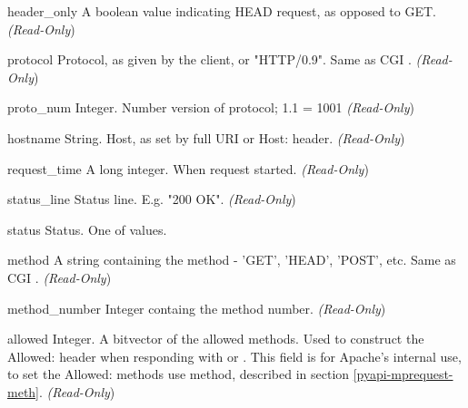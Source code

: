 \begin{memberdesc}[Request]{header_only}
A boolean value indicating HEAD request, as opposed to GET. 
\emph{(Read-Only})
\end{memberdesc}

\begin{memberdesc}[Request]{protocol}
Protocol, as given by the client, or "HTTP/0.9". Same as CGI .
\emph{(Read-Only})
\end{memberdesc}

\begin{memberdesc}[Request]{proto_num}
Integer. Number version of protocol; 1.1 = 1001 
\emph{(Read-Only})
\end{memberdesc}

\begin{memberdesc}[Request]{hostname}
String. Host, as set by full URI or Host: header.
\emph{(Read-Only})
\end{memberdesc}

\begin{memberdesc}[Request]{request_time}
A long integer. When request started.
\emph{(Read-Only})
\end{memberdesc}

\begin{memberdesc}[Request]{status_line}
Status line. E.g. "200 OK". 
\emph{(Read-Only})
\end{memberdesc}

\begin{memberdesc}[Request]{status}
Status. One of  values.
\end{memberdesc}

\begin{memberdesc}[Request]{method}
A string containing the method - 'GET', 'HEAD', 'POST', etc.
Same as CGI .
\emph{(Read-Only})
\end{memberdesc}

\begin{memberdesc}[Request]{method_number}
Integer containg the method number.
\emph{(Read-Only})
\end{memberdesc}

\begin{memberdesc}[Request]{allowed}
Integer. A bitvector of the allowed methods. Used to construct the
Allowed: header when responding with
 or
. This field is for Apache's internal
use, to set the Allowed: methods use 
method, described in section \ref{pyapi-mprequest-meth}. 
\emph{(Read-Only})
\end{memberdesc}

